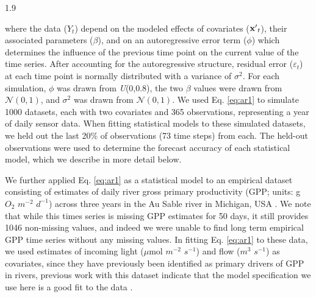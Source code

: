 \documentclass[12pt,english]{article} %
\begin{document}
\begin{linenumbers}
\begin{spacing}{1.9}
\begin{flushleft}
\begin{subequations}
\end{subequations}
\vspace{-2em}
\noindent where the data ($Y_t$) depend on the modeled effects of covariates (${\bf x'}_t$), their associated parameters ($\beta$), and on an autoregressive error term ($\phi$) which determines the influence of the previous time point on the current value of the time series. After accounting for the autoregressive structure, residual error ($\varepsilon_t$) at each time point is normally distributed with a variance of $\sigma^2$. For each simulation, $\phi$ was drawn from \textit{U}(0,0.8), the two $\beta$ values were drawn from $\mathcal{N}(0,1)$, and $\sigma^2$ was drawn from $\mathcal{N}(0,1)$. We used Eq. \ref{eq:ar1} to simulate 1000 datasets, each with two covariates and 365 observations, representing a year of daily sensor data. When fitting statistical models to these simulated datasets, we held out the last 20\% of observations (73 time steps) from each. The held-out observations were used to determine the forecast accuracy of each statistical model, which we describe in more detail below. 
 

\hspace{1em} We further applied Eq. \ref{eq:ar1} as a statistical model to an empirical dataset consisting of estimates of daily river gross primary productivity (GPP; units: g \(O_2\) \(m^{-2}\) \(d^{-1}\)) across three years in the Au Sable river in Michigan, USA  \citep{appling_metabolic_2018}. We note that while this times series is missing GPP estimates for 50 days, it still provides 1046 non-missing values, and indeed we were unable to find long term empirical GPP time series without any missing values. In fitting Eq. \ref{eq:ar1} to these data, we used estimates of incoming light (\(\mu\)mol \(m^{-2}\) \(s^{-1}\)) and flow (\(m^{3}\) \(s^{-1}\)) as covariates, since they have previously been identified as primary drivers of GPP in rivers, previous work with this dataset indicate that the model specification we use here is a good fit to the data \citep{bernhardt2022light}. 



\end{flushleft}
\end{spacing}
\end{linenumbers}
\end{document}
